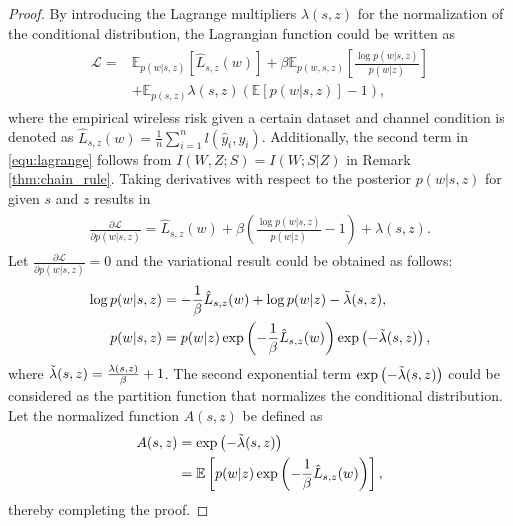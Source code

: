\documentclass[lettersize,journal]{IEEEtran}
\newcommand{\E}{\mathbb{E}}
\theoremstyle{definition}
\theoremstyle{plain}
\begin{document}
\begin{proof}
    By introducing the Lagrange multipliers $\lambda(s,z)$ for the normalization of the conditional distribution, the Lagrangian function could be written as
    \begin{align}
        \label{equ:lagrange}
        \begin{split}
            \mathcal{L}= & \E_{p(w|s,z)} \left[\hat{L}_{s,z}(w)\right] + \beta \E_{p(w,s,z)}\left[\frac{\log p(w|s,z)}{p(w|z)}\right]\\ 
            & + \E_{p(s,z)}\lambda(s,z)\left(\E \left[p(w|s,z)\right] - 1\right),
        \end{split}
    \end{align}
    where the empirical wireless risk given a certain dataset and channel condition is denoted as $\hat{L}_{s,z}(w) = \frac{1}{n} \sum_{i=1}^n l(\hat{y}_i,y_i)$. 
    Additionally, the second term in \cref{equ:lagrange} follows from $I(W,Z;S)=I(W;S|Z)$ in Remark \ref{thm:chain_rule}.
    Taking derivatives with respect to the posterior $p(w|s,z)$ for given $s$ and $z$ results in
    \begin{align}
        \begin{split}
            \frac{\partial\mathcal{L}}{\partial p(w|s,z)} = \hat{L}_{s,z}(w) + \beta \left(\frac{\log p(w|s,z)}{p(w|z)}-1\right) + \lambda(s,z).
        \end{split}
    \end{align}
    Let $\frac{\partial\mathcal{L}}{\partial p(w|s,z)}=0$ and the variational result could be obtained as follows:
    \begin{align}
        \begin{split}
            \log p(w|s,z) & = -\frac{1}{\beta}\hat{L}_{s,z}(w) + \log p(w|z) - \Tilde{\lambda}(s,z), \\
            p(w|s,z) & = p(w|z) \exp\left(-\frac{1}{\beta}\hat{L}_{s,z}(w)\right)\exp\left(-\Tilde{\lambda}(s,z)\right),
        \end{split}
    \end{align}
    where $\Tilde{\lambda}(s,z) = \frac{\lambda(s,z)}{\beta} + 1$. The second exponential term $\exp\left(-\Tilde{\lambda}(s,z)\right)$ could be considered as the partition function that normalizes the conditional distribution. Let the normalized function $A(s,z)$ be defined as 
    \begin{equation}
        \begin{split}
            A(s,z) & = \exp\left(-\Tilde{\lambda}(s,z)\right) \\
            & = \E\left[p(w|z) \exp\left(-\frac{1}{\beta}\hat{L}_{s,z}(w)\right)\right],
        \end{split}
    \end{equation}
    thereby completing the proof. 
\end{proof}
\end{document}
